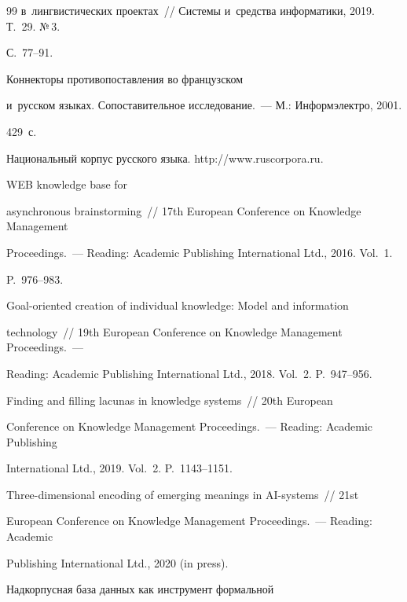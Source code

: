 {{\begin{thebibliography}{99}
в~лингвистических проектах~/\!\!/ Системы и~средства информатики, 2019. Т.~29. №\,3. 


С.~77--91.







 Коннекторы противопоставления во французском 


и~русском языках. Сопоставительное исследование.~--- М.: Информэлектро, 2001. 


429~с.




Национальный корпус русского языка. {\sf http://www.ruscorpora.ru}.




 WEB knowledge base for 


asynchronous brainstorming~/\!\!/ 17th European Conference on Knowledge Management 


Proceedings.~--- Reading: Academic Publishing International Ltd., 2016. Vol.~1.  


P.~976--983.




 Goal-oriented creation of individual knowledge: Model and information 


technology~/\!\!/ 19th European Conference on Knowledge Management Proceedings.~--- 


Reading: Academic Publishing International Ltd., 2018. Vol.~2. P.~947--956.




 Finding and filling lacunas in knowledge systems~/\!\!/ 20th European 


Conference on Knowledge Management Proceedings.~--- Reading: Academic Publishing 


International Ltd., 2019. Vol.~2. P.~1143--1151.




 Three-dimensional encoding of emerging meanings in AI-systems~/\!\!/ 21st 


European Conference on Knowledge Management Proceedings.~--- Reading: Academic 


Publishing International Ltd., 2020 (in press).




 Надкорпусная база данных как инструмент формальной 



\end{thebibliography}}}
